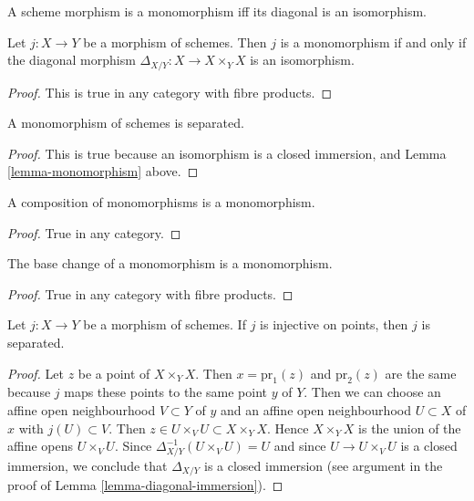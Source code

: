 \begin{lemma}
\label{lemma-monomorphism}
\begin{slogan}
A scheme morphism is a monomorphism iff its diagonal is an isomorphism.
\end{slogan}
Let $j : X \to Y$ be a morphism of schemes.
Then $j$ is a monomorphism if and only if the
diagonal morphism $\Delta_{X/Y} : X \to X \times_Y X$ is
an isomorphism.
\end{lemma}

\begin{proof}
This is true in any category with fibre products.
\end{proof}

\begin{lemma}
\label{lemma-monomorphism-separated}
A monomorphism of schemes is separated.
\end{lemma}

\begin{proof}
This is true because an isomorphism is a closed immersion,
and Lemma \ref{lemma-monomorphism} above.
\end{proof}

\begin{lemma}
\label{lemma-composition-monomorphism}
A composition of monomorphisms is a monomorphism.
\end{lemma}

\begin{proof}
True in any category.
\end{proof}

\begin{lemma}
\label{lemma-base-change-monomorphism}
The base change of a monomorphism is a monomorphism.
\end{lemma}

\begin{proof}
True in any category with fibre products.
\end{proof}

\begin{lemma}
\label{lemma-injective-points}
Let $j : X \to Y$ be a morphism of schemes.
If $j$ is injective on points, then $j$ is separated.
\end{lemma}

\begin{proof}
Let $z$ be a point of $X \times_Y X$. Then $x = \text{pr}_1(z)$ and
$\text{pr}_2(z)$ are the same because $j$ maps these points to
the same point $y$ of $Y$. Then we can choose an affine
open neighbourhood $V \subset Y$ of $y$ and an affine open
neighbourhood $U \subset X$ of $x$ with $j(U) \subset V$.
Then $z \in U \times_V U \subset X \times_Y X$.
Hence $X \times_Y X$ is the union of the affine
opens $U \times_V U$. Since $\Delta_{X/Y}^{-1}(U \times_V U) = U$
and since $U \to U \times_V U$ is a closed immersion, we conclude
that $\Delta_{X/Y}$ is a closed immersion (see argument in the
proof of Lemma \ref{lemma-diagonal-immersion}).
\end{proof}

